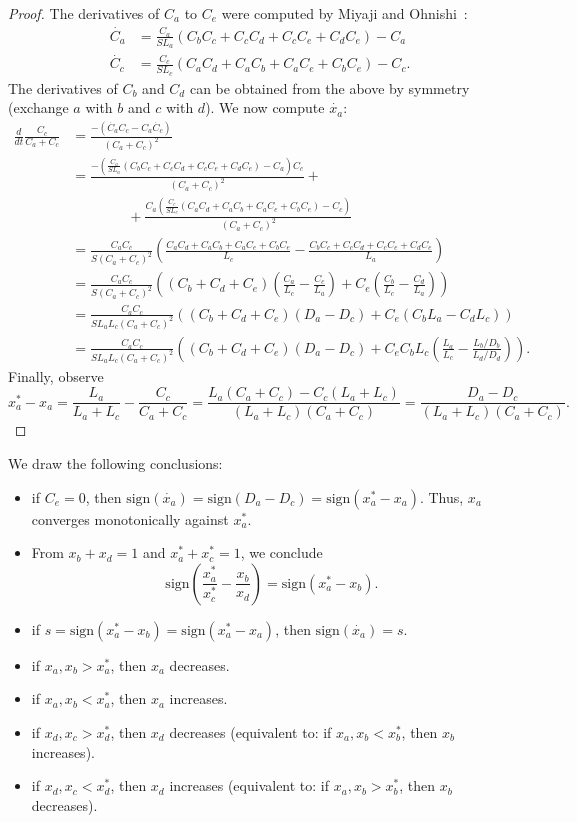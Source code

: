 \documentclass[11pt,a4paper]{article}
\newcommand{\sign}{\mathrm{sign}}
\begin{document}
\begin{proof} The derivatives of $C_a$ to $C_e$ were computed by 
Miyaji and Ohnishi~\cite{Miyaji-Ohnish07}: 
\begin{align*}
\dot{C_a} &= \frac{C_a}{S L_a} (C_b C_c + C_c C_d + C_c C_e + C_d C_e) - C_a \\
\dot{C_c} &= \frac{C_c}{S L_c} (C_a C_d + C_a C_b + C_a C_e + C_b C_e) - C_c.  
\end{align*}
The derivatives of $C_b$ and $C_d$ can be obtained from the above by symmetry (exchange $a$ with $b$ and $c$ with $d$). 
We now compute $\dot{x_a}$:  
\begin{align*}
\frac{d}{dt} \frac{C_c}{C_a + C_c} 
&= \frac{ - (\dot{C_a} C_c - C_a \dot{C_c})}{(C_a + C_c)^2}\\
&= \frac{{-\left(\frac{C_a }{S L_a}(C_bC_c + C_cC_d + C_cC_e + C_dC_e) -
C_a\right)C_c}}{(C_a+C_c)^2} + 
\\
& \qquad\qquad + \frac{C_a \left(\frac{C_c }{S L_c}(C_aC_d + C_aC_b + C_aC_e +
C_bC_e) - C_c\right)}{(C_a + C_c)^2}\\
&=\frac{C_a C_c }{S (C_a + C_c)^2} \left(\frac{C_aC_d + C_aC_b + C_aC_e + C_bC_e}{L_c} - \frac{C_bC_c +
C_cC_d + C_cC_e + C_dC_e}{L_a}\right)\\
&= \frac{C_a C_c }{S (C_a + C_c)^2} \left( (C_b + C_d + C_e)\left(\frac{C_a}{L_c} - \frac{C_c}{L_a}\right) +
C_e\left(\frac{ C_b}{L_c} - \frac{C_d}{L_a}\right) \right)\\
&= \frac{C_a C_c }{S L_a L_c (C_a + C_c)^2} \left( (C_b + C_d + C_e)(D_a - D_c) +
C_e ( C_b L_a - C_d L_c ) \right)\\
&= \frac{C_a C_c }{S L_a L_c (C_a + C_c)^2} \left( (C_b + C_d + C_e)(D_a - D_c) +
  C_e C_b L_c  \left( \frac{L_a}{L_c} - \frac{L_b/D_b}{L_d/D_d} \right)\right). 
\end{align*}
Finally, observe
\[ x^*_a - x_a = \frac{L_a}{L_a + L_c} - \frac{C_c}{C_a + C_c}= \frac{L_a(C_a + C_c) - C_c(L_a +
L_c)}{(L_a + L_c)(C_a + C_c)} = \frac{D_a - D_c}{(L_a + L_c)(C_a + C_c)} .\]\end{proof}


We draw the following conclusions:
\begin{itemize}
\item[-] if $C_e = 0$, then $\sign(\dot{x_a}) = \sign(D_a - D_c) = \sign(x_a^*
- x_a)$. Thus, $x_a$ converges monotonically against $x_a^*$. 
\item[-] From $x_b + x_d = 1$ and $x_a^* + x_c^* = 1$, we conclude
\[ \sign\left(\frac{x_a^*}{x_c^*} - \frac{x_b}{x_d}\right) =
\sign(x_a^* - x_b). \]
\item[-] if $s = \sign(x_a^* - x_b) = \sign(x_a^* - x_a)$, then
$\sign(\dot{x_a}) = s$. 
\item[-] if $x_a, x_b > x_a^*$, then $x_a$ decreases.
\item[-] if $x_a, x_b < x_a^*$, then $x_a$ increases.
\item[-] if $x_d, x_c > x_d^*$, then $x_d$ decreases (equivalent to: if $x_a, x_b < x_b^*$, then $x_b$ increases).
\item[-] if $x_d, x_c < x_d^*$, then $x_d$ increases (equivalent to: if $x_a, x_b > x_b^*$, then $x_b$ decreases).
\end{itemize}
\end{document}
